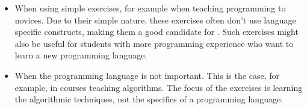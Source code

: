 \documentclass[5p,number]{elsarticle}
\begin{document}
    \begin{itemize}
        \item When using simple exercises, for example when teaching programming to novices.
        Due to their simple nature, these exercises often don't use language specific constructs, making them a good candidate for \tested{}.
        Such exercises might also be useful for students with more programming experience who want to learn a new programming language.
        \item When the programming language is not important.
        This is the case, for example, in courses teaching algorithms.
        The focus of the exercises is learning the algorithmic techniques, not the specifics of a programming language.
    \end{itemize}
    

    
    
\end{document}
